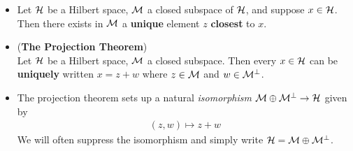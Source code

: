 \documentclass[11pt]{article}
\begin{document}
\begin{itemize}
\item \begin{lemma}
Let ${\mathcal H}$ be a Hilbert space, ${\mathcal M}$ a closed subspace of ${\mathcal H}$, and suppose $x \in {\mathcal H}$. Then there exists in ${\mathcal M}$ a \textbf{unique} element $z$ \textbf{closest} to $x$.
\end{lemma}


\item \begin{theorem} (\textbf{The Projection Theorem})\\
Let ${\mathcal H}$ be a Hilbert space, ${\mathcal M}$ a closed subspace. Then every $x \in {\mathcal H}$ can be \textbf{uniquely} written $x = z + w$ where $z \in {\mathcal M}$ and $w \in {\mathcal M}^{\bot}$.
\end{theorem}

\item \begin{remark}
The projection theorem sets up a natural \emph{isomorphism} ${\mathcal M} \oplus {\mathcal M}^{\bot} \rightarrow {\mathcal H} $ given by
\begin{align*}
(z, w) \mapsto z + w
\end{align*}
We will often suppress the isomorphism and simply write ${\mathcal H} = {\mathcal M} \oplus {\mathcal M}^{\bot}$.
\end{remark}

\end{itemize}
\end{document}
